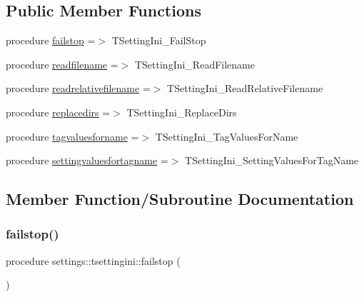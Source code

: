 \subsection*{Public Member Functions}
\begin{DoxyCompactItemize}
\item 
procedure \mbox{\hyperlink{structsettings_1_1tsettingini_a2bbd8bb7c0a3ab77cede69462ba23e46}{failstop}} =$>$ T\+Setting\+Ini\+\_\+\+Fail\+Stop
\item 
procedure \mbox{\hyperlink{structsettings_1_1tsettingini_afdd4429ecc8fa56173a0d888be03d432}{readfilename}} =$>$ T\+Setting\+Ini\+\_\+\+Read\+Filename
\item 
procedure \mbox{\hyperlink{structsettings_1_1tsettingini_aca86ab4a8cbcb80ceb32785a65329005}{readrelativefilename}} =$>$ T\+Setting\+Ini\+\_\+\+Read\+Relative\+Filename
\item 
procedure \mbox{\hyperlink{structsettings_1_1tsettingini_a3ed949df4becdea6175a7a498de147ec}{replacedirs}} =$>$ T\+Setting\+Ini\+\_\+\+Replace\+Dirs
\item 
procedure \mbox{\hyperlink{structsettings_1_1tsettingini_aafb75b35735adcb40184e2a0d26583c7}{tagvaluesforname}} =$>$ T\+Setting\+Ini\+\_\+\+Tag\+Values\+For\+Name
\item 
procedure \mbox{\hyperlink{structsettings_1_1tsettingini_a4ad2923f186902e83ba1e769baf3ab28}{settingvaluesfortagname}} =$>$ T\+Setting\+Ini\+\_\+\+Setting\+Values\+For\+Tag\+Name
\end{DoxyCompactItemize}


\subsection{Member Function/\+Subroutine Documentation}
\mbox{\label{structsettings_1_1tsettingini_a2bbd8bb7c0a3ab77cede69462ba23e46}} 
\subsubsection{\texorpdfstring{failstop()}{failstop()}}
{\footnotesize\ttfamily procedure settings\+::tsettingini\+::failstop (\begin{DoxyParamCaption}{ }\end{DoxyParamCaption})}

\mbox{\label{structsettings_1_1tsettingini_afdd4429ecc8fa56173a0d888be03d432}} 
